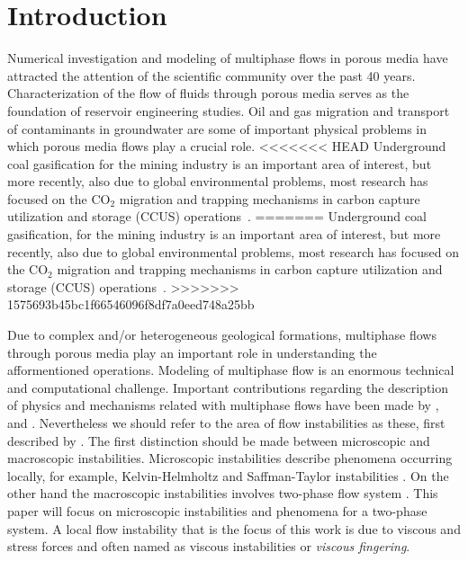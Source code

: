 \documentclass[preprint,authoryear,12pt]{elsarticle}
\begin{document}
\section{Introduction}\label{section:intro}
\medskip
Numerical investigation and modeling of multiphase flows in porous media have attracted the attention of the scientific community over the past 40 years. Characterization of the flow of fluids through porous media serves as the foundation of reservoir engineering studies. Oil and gas migration and transport of contaminants in groundwater are some of important physical problems in which porous media flows play a crucial role. 
<<<<<<< HEAD
Underground coal gasification for the mining industry is an important area of interest, but more recently, also due to global environmental problems, most research has focused on the CO$_{\text{2}}$ migration and trapping mechanisms in carbon capture utilization and storage (CCUS) operations~\citep{spycher_2003, chen_2006, self_2012, pruess_1990c, white_1981,jiang_2011}.
=======
Underground coal gasification, for the mining industry is an important area of interest, but more recently, also due to global environmental problems, most research has focused on the CO$_{\text{2}}$ migration and trapping mechanisms in carbon capture utilization and storage (CCUS) operations~\citep{spycher_2003, chen_2006, self_2012, pruess_1990c, white_1981,jiang_2011}.
>>>>>>> 1575693b45bc1f66546096f8df7a0eed748a25bb

\medskip
Due to complex and/or heterogeneous geological formations, multiphase flows through porous media play an important role in understanding the afformentioned operations. Modeling of multiphase flow is an enormous technical and computational challenge. Important contributions regarding the description of physics and mechanisms related with multiphase flows have been made by \citet{wooding_1976}, \citet{homsy_1987} and \citet{adler_1988}. Nevertheless we should refer to the area of flow instabilities  as these, first described by \citet{saffman_1958}. The first distinction should be made between microscopic and macroscopic instabilities. Microscopic instabilities describe phenomena occurring locally, for example, Kelvin-Helmholtz and Saffman-Taylor instabilities \citep{saffman_1959}. On the other hand the macroscopic instabilities involves two-phase flow system \citep{bottoni_1992}. This paper will focus on microscopic instabilities and phenomena for a two-phase system. A local flow instability that is the focus of this work is due to viscous and stress forces and often named as viscous instabilities or \textit{viscous fingering}. 
\end{document}
